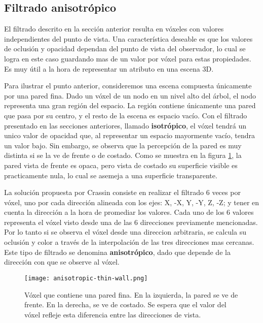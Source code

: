 
\subsection{Filtrado anisotrópico}

El filtrado descrito en la sección anterior resulta en vóxeles con valores independientes del punto de vista.
Una característica deseable es que los valores de oclusión y opacidad dependan del punto de vista del observador, lo cual se logra en este caso guardando mas de un valor por vóxel para estas propiedades.
Es muy útil a la hora de representar un atributo en una escena 3D.

Para ilustrar el punto anterior, consideremos una escena compuesta únicamente por una pared fina.
Dado un vóxel de un nodo en un nivel alto del árbol, el nodo representa una gran región del espacio.
La región contiene únicamente una pared que pasa por su centro, y el resto de la escena es espacio vacío.
Con el filtrado presentado en las secciones anteriores, llamado \textbf{isotrópico}, el vóxel tendrá un unico valor de opacidad que, al representar un espacio mayormente vacío, tendra un valor bajo.
Sin embargo, se observa que la percepción de la pared es muy distinta si se la ve de frente o de costado.
Como se muestra en la figura \ref{fig:anisotropic-thin-wall}, la pared vista de frente es opaca, pero vista de costado su superficie visible es practicamente nula, lo cual se asemeja a una superficie transparente.

La solución propuesta por Crassin \cite{voxel-cone-tracing} consiste en realizar el filtrado 6 veces por vóxel, uno por cada dirección alineada con los ejes: X, -X, Y, -Y, Z, -Z; y tener en cuenta la dirección a la hora de promediar los valores.
Cada uno de los 6 valores representa el vóxel visto desde una de las 6 direcciones previamente mencionadas. Por lo tanto si se observa el vóxel desde una direccion arbitraria, se calcula su oclusión y color a través de la interpolación de las tres direcciones mas cercanas.
Este tipo de filtrado se denomina \textbf{anisotrópico}, dado que depende de la dirección con que se observe al vóxel.

\begin{figure}
    \centering
    \texttt{[image: anisotropic-thin-wall.png]}
    \caption{
        Vóxel que contiene una pared fina.
        En la izquierda, la pared se ve de frente.
        En la derecha, se ve de costado.
        Se espera que el valor del vóxel refleje esta diferencia entre las direcciones de vista.
    }
    \label{fig:anisotropic-thin-wall}
\end{figure}

